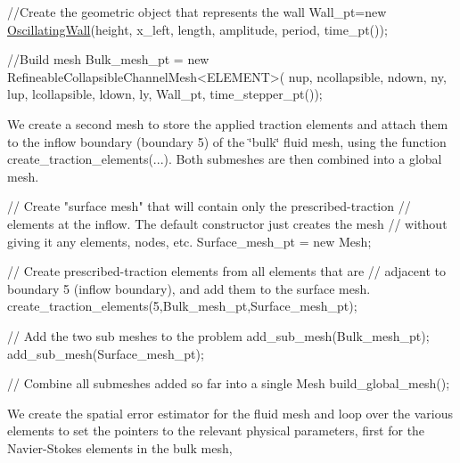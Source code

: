 \begin{DoxyCodeInclude}
 \textcolor{comment}{//Create the geometric object that represents the wall}
 Wall\_pt=\textcolor{keyword}{new} \hyperlink{classOscillatingWall}{OscillatingWall}(height, x\_left, length, amplitude, period,
                             time\_pt());

 \textcolor{comment}{//Build mesh}
 Bulk\_mesh\_pt = \textcolor{keyword}{new} RefineableCollapsibleChannelMesh<ELEMENT>(
  nup, ncollapsible, ndown, ny,
  lup, lcollapsible, ldown, ly,
  Wall\_pt,
  time\_stepper\_pt());

\end{DoxyCodeInclude}


We create a second mesh to store the applied traction elements and attach them to the inflow boundary (boundary 5) of the \char`\"{}bulk\char`\"{} fluid mesh, using the function {\ttfamily create\+\_\+traction\+\_\+elements}(...). Both submeshes are then combined into a global mesh.


\begin{DoxyCodeInclude}
 \textcolor{comment}{// Create "surface mesh" that will contain only the prescribed-traction }
 \textcolor{comment}{// elements at the inflow. The default constructor just creates the mesh }
 \textcolor{comment}{// without giving it any elements, nodes, etc.}
 Surface\_mesh\_pt = \textcolor{keyword}{new} Mesh;
 
 \textcolor{comment}{// Create prescribed-traction elements from all elements that are }
 \textcolor{comment}{// adjacent to boundary 5 (inflow boundary), and add them to the surface mesh.}
 create\_traction\_elements(5,Bulk\_mesh\_pt,Surface\_mesh\_pt);

 \textcolor{comment}{// Add the two sub meshes to the problem}
 add\_sub\_mesh(Bulk\_mesh\_pt);
 add\_sub\_mesh(Surface\_mesh\_pt);

 \textcolor{comment}{// Combine all submeshes added so far into a single Mesh}
 build\_global\_mesh();

\end{DoxyCodeInclude}


We create the spatial error estimator for the fluid mesh and loop over the various elements to set the pointers to the relevant physical parameters, first for the Navier-\/\+Stokes elements in the bulk mesh,


